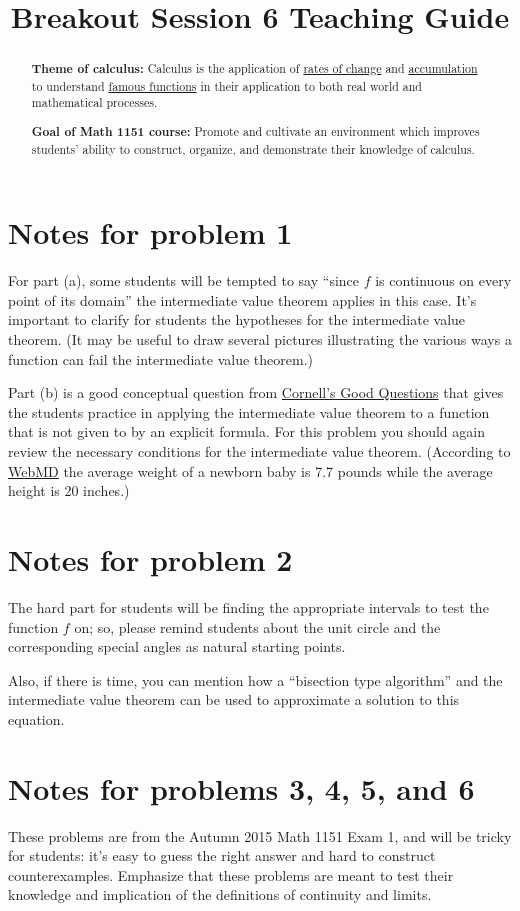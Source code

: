 \documentclass[nooutcomes]{ximera}
\title{Breakout Session 6 Teaching Guide}
\begin{document}
\begin{abstract}
 \textbf{Theme of calculus:} Calculus is the application of  \href{https://en.wikipedia.org/wiki/Derivative}{rates of change} and \href{https://en.wikipedia.org/wiki/Integral}{accumulation} to understand \href{https://en.wikipedia.org/wiki/Elementary_function}{famous functions} in their application to both real world and mathematical processes.

  \textbf{Goal of Math 1151 course:} Promote and cultivate an environment which improves students' ability to construct, organize, and demonstrate their knowledge of calculus.
\end{abstract}
\maketitle

\section{Notes for problem 1}
For part (a), some students will be tempted to say ``since $f$ is continuous on every point of its domain'' the intermediate value theorem applies in this case.
It's important to clarify for students the hypotheses for the intermediate value theorem.
(It may be useful to draw several pictures illustrating the various ways a function can fail the intermediate value theorem.)

Part (b) is a good conceptual question from \href{http://www.math.cornell.edu/~GoodQuestions/}{Cornell's Good Questions} that gives the students practice in applying the intermediate value theorem to a function that is not given to by an explicit formula.
For this problem you should again review the necessary conditions for the intermediate value theorem.
(According to \href{http://www.webmd.boots.com/children/baby/guide/normal-baby-size-at-birth}{WebMD} the average weight of a newborn baby is 7.7 pounds while the average height is 20 inches.)

\section{Notes for problem 2}
The hard part for students will be finding the appropriate intervals to test the function $f$ on; so, please remind students about the unit circle and the corresponding special angles as natural starting points.

Also, if there is time, you can mention how a ``bisection type algorithm'' and the intermediate value theorem can be used to approximate a solution to this equation.


\section{Notes for problems 3, 4, 5, and 6}
These problems are from the Autumn 2015 Math 1151 Exam 1, and will be tricky for students: it's easy to guess the right answer and hard to construct counterexamples.
Emphasize that these problems are meant to test their knowledge and implication of the definitions of continuity and limits.
\end{document}
